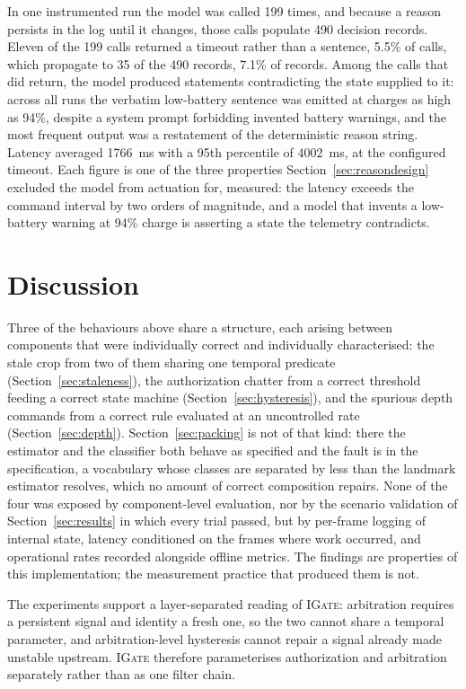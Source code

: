 \documentclass[conference]{IEEEtran}
\newcommand{\method}[1]{\textsc{#1}}
\begin{document}
In one instrumented run the model was called 199 times, and because a reason
persists in the log until it changes, those calls populate 490 decision records.
Eleven of the 199 calls returned a timeout rather than a sentence, 5.5\% of
calls, which propagate to 35 of the 490 records, 7.1\% of records. Among the
calls that did return, the model produced statements contradicting the state
supplied to it: across all runs the verbatim low-battery sentence was emitted at
charges as high as 94\%, despite a system prompt forbidding invented battery
warnings, and the most frequent output was a restatement of the deterministic
reason string. Latency averaged 1766~ms with a 95th percentile of 4002~ms, at
the configured timeout. Each figure is one of the three properties
Section~\ref{sec:reasondesign} excluded the model from actuation for, measured:
the latency exceeds the command interval by two orders of magnitude, and a model
that invents a low-battery warning at 94\% charge is asserting a state the
telemetry contradicts.

\section{Discussion}

Three of the behaviours above share a structure, each arising between
components that were individually correct and individually characterised: the
stale crop from two of them sharing one temporal predicate
(Section~\ref{sec:staleness}), the authorization chatter from a correct
threshold feeding a correct state machine (Section~\ref{sec:hysteresis}), and
the spurious depth commands from a correct rule evaluated at an uncontrolled
rate (Section~\ref{sec:depth}). Section~\ref{sec:packing} is not of that kind:
there the estimator and the classifier both behave as specified and the fault is
in the specification, a vocabulary whose classes are separated by less than the
landmark estimator resolves, which no amount of correct composition repairs.
None of the four was exposed by component-level evaluation, nor by the scenario
validation of Section~\ref{sec:results} in which every trial passed, but
by per-frame logging of internal state, latency conditioned on the frames where
work occurred, and operational rates recorded alongside offline metrics. The
findings are properties of this implementation; the measurement practice that
produced them is not.

The experiments support a layer-separated reading of \method{IGate}: arbitration
requires a persistent signal and identity a fresh one, so the two cannot share a
temporal parameter, and arbitration-level hysteresis cannot repair a signal
already made unstable upstream. \method{IGate} therefore parameterises
authorization and arbitration separately rather than as one filter chain.
\end{document}
